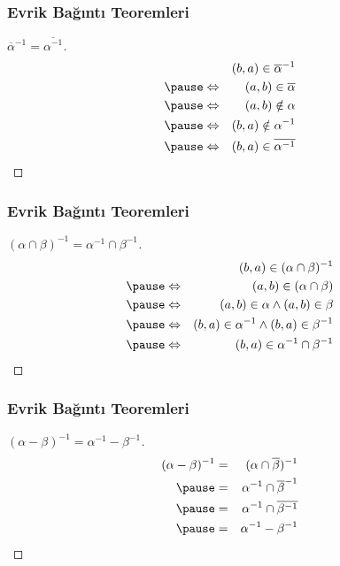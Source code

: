 \documentclass[dvipsnames]{beamer}
\theoremstyle{definition}
\theoremstyle{example}
\theoremstyle{plain}
\begin{document}
\begin{frame}
  \frametitle{Evrik Bağıntı Teoremleri}

  \begin{proof}[$\overline{\alpha}^{-1} = \overline{\alpha^{-1}}$]
    \begin{eqnarray*}
      &                 & (b,a) \in \overline{\alpha}^{-1}\\\pause
      & \Leftrightarrow & (a,b) \in \overline{\alpha}\\\pause
      & \Leftrightarrow & (a,b) \notin \alpha\\\pause
      & \Leftrightarrow & (b,a) \notin \alpha^{-1}\\\pause
      & \Leftrightarrow & (b,a) \in \overline{\alpha^{-1}}
    \end{eqnarray*}
  \end{proof}
\end{frame}

\begin{frame}
  \frametitle{Evrik Bağıntı Teoremleri}

  \begin{proof}[$(\alpha \cap \beta)^{-1} = \alpha^{-1} \cap \beta^{-1}$]
    \begin{eqnarray*}
      &                 & (b,a) \in (\alpha \cap \beta)^{-1}\\\pause
      & \Leftrightarrow & (a,b) \in (\alpha \cap \beta)\\\pause
      & \Leftrightarrow & (a,b) \in \alpha \wedge (a,b) \in \beta\\\pause
      & \Leftrightarrow & (b,a) \in \alpha^{-1}
                   \wedge (b,a) \in \beta^{-1}\\\pause
      & \Leftrightarrow & (b,a) \in \alpha^{-1} \cap \beta^{-1}
    \end{eqnarray*}
  \end{proof}
\end{frame}

\begin{frame}
  \frametitle{Evrik Bağıntı Teoremleri}

  \begin{proof}[$(\alpha - \beta)^{-1} = \alpha^{-1} - \beta^{-1}$]
    \begin{eqnarray*}
      (\alpha - \beta)^{-1} & = & (\alpha \cap \overline{\beta})^{-1}\\\pause
                            & = & \alpha^{-1} \cap \overline{\beta}^{-1}\\\pause
                            & = & \alpha^{-1} \cap \overline{\beta^{-1}}\\\pause
                            & = & \alpha^{-1} - \beta^{-1}
    \end{eqnarray*}
  \end{proof}
\end{frame}
\end{document}
